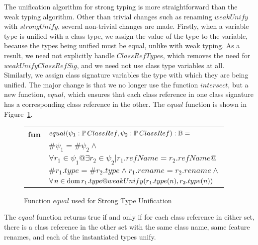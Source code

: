 The unification algorithm for strong typing is more straightforward
than the weak typing algorithm. Other than trivial changes such as
renaming $weakUnify$ with $strongUnify$, several non-trivial changes
are made. Firstly, when a variable type is unified with a class type,
we assign the value of the type to the variable, because the types
being unified must be equal, unlike with weak typing. As a result, we
need not explicitly handle $ClassRefType$s, which removes the need for
$weakUnifyClassRefSig$, and we need not use class type variables at
all. Similarly, we assign class signature variables the type with
which they are being unified. The major change is that we no longer
use the function $intersect$, but a new function, $equal$, which
ensures that each class reference in one class signature has a
corresponding class reference in the other. The $equal$ function is
shown in Figure~\ref{equal-classref}.

\begin{figure}[t]
\begin{tabular}{ll}
  {\bf fun} & $equal(\psi_1:\power ClassRef, \psi_2:\power ClassRef) : \bool =$\\
   & \quad\quad$\#\psi_1 = \#\psi_2 \land$\\
   & \quad\quad$\forall r_1 \in \psi_1 @ \exists r_2 \in \psi_2 | r_1.refName = r_2.refName @$\\
   & \quad\quad\quad\quad $\#r_1.type = \#r_2.type \land r_1.rename = r_2.rename \land$\\
   & \quad\quad\quad\quad $\forall n \in \dom r_1.type @
       weakUnify(r_1.type(n), r_2.type(n))$
\end{tabular}
\caption{Function $equal$ used for Strong Type Unification}
\label{equal-classref}
\end{figure}

The $equal$ function returns true if and only if for each class
reference in either set, there is a class reference in the other set
with the same class name, same feature renames, and each of the
instantiated types unify.

